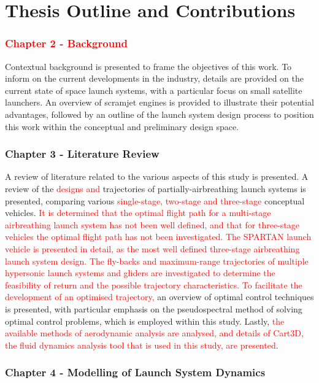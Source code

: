   \clearpage
  \section{Thesis Outline and Contributions}

    \textcolor{red}{
    \subsubsection*{Chapter 2 - Background}
}
	Contextual background is presented to frame the objectives of this work. To inform on the current developments in the industry, details are provided on the current state of space launch systems, with a particular focus on small satellite launchers. An overview of scramjet engines is provided to illustrate their potential advantages, followed by an outline of the launch system design process to position this work within the conceptual and preliminary design space.

    \subsubsection*{Chapter 3 - Literature Review}
\texttt{}
      A review of literature related to the various aspects of this study is presented. A review of the \textcolor{red}{designs and }trajectories of partially-airbreathing launch systems is presented, comparing various \textcolor{red}{single-stage, two-stage and three-stage} conceptual vehicles. \textcolor{red}{It is determined that the optimal flight path for a multi-stage airbreathing launch system has not been well defined, and that for three-stage vehicles the optimal flight path has not been investigated. The SPARTAN launch vehicle is presented in detail, as the most well defined three-stage airbreathing launch system design. The fly-backs and maximum-range trajectories of multiple hypersonic launch systems and gliders are investigated to determine the feasibility of return and the possible trajectory characteristics.} \textcolor{red}{To facilitate the development of an optimised trajectory, }an overview of optimal control techniques is presented, with particular emphasis on the pseudospectral method of solving optimal control problems, which is employed within this study. Lastly, \textcolor{red}{the available methods of aerodynamic analysis are analysed, and details of Cart3D, the fluid dynamics analysis tool that is used in this study, are presented}.
      

    \subsubsection*{Chapter 4 - Modelling of Launch System Dynamics}

